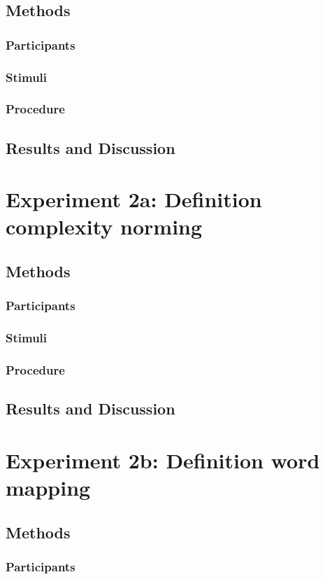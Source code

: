 \subsection{Methods}
\subsubsection{Participants} 
\subsubsection{Stimuli} 
\subsubsection{Procedure}
\subsection{Results and Discussion}

\section{Experiment 2a: Definition complexity norming }
\subsection{Methods}
\subsubsection{Participants} 
\subsubsection{Stimuli} 
\subsubsection{Procedure}
\subsection{Results and Discussion}

\section{Experiment 2b: Definition word mapping}
\subsection{Methods}
\subsubsection{Participants} 
